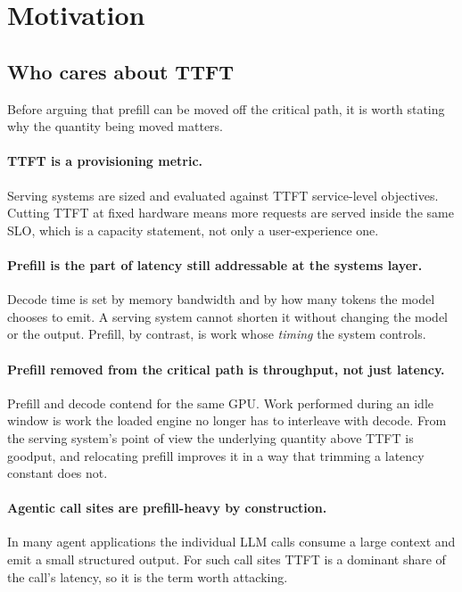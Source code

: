 \section{Motivation}
\label{sec:motivation}

\subsection{Who cares about TTFT}

Before arguing that prefill can be moved off the critical path, it is worth
stating why the quantity being moved matters.

\paragraph{TTFT is a provisioning metric.} Serving systems are sized and evaluated
against TTFT service-level objectives. Cutting TTFT at fixed hardware means more
requests are served inside the same SLO, which is a capacity statement, not only
a user-experience one.

\paragraph{Prefill is the part of latency still addressable at the systems layer.}
Decode time is set by memory bandwidth and by how many tokens the model chooses
to emit. A serving system cannot shorten it without changing the model or the
output. Prefill, by contrast, is work whose \emph{timing} the system controls.

\paragraph{Prefill removed from the critical path is throughput, not just latency.}
Prefill and decode contend for the same GPU. Work performed during an idle window
is work the loaded engine no longer has to interleave with decode. From the
serving system's point of view the underlying quantity above TTFT is goodput, and
relocating prefill improves it in a way that trimming a latency constant does not.

\paragraph{Agentic call sites are prefill-heavy by construction.} In many agent
applications the individual LLM calls consume a large context and emit a small
structured output. For such call sites TTFT is a dominant share of the call's
latency, so it is the term worth attacking.

